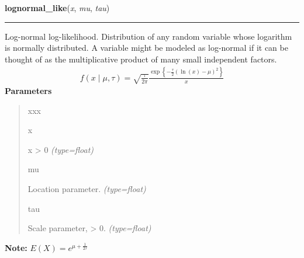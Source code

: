     \vspace{0.5ex}

\hspace{.8\funcindent}\begin{boxedminipage}{\funcwidth}

    \raggedright \textbf{lognormal\_like}(\textit{x}, \textit{mu}, \textit{tau})

    \vspace{-1.5ex}

    \rule{\textwidth}{0.5\fboxrule}
\setlength{\parskip}{2ex}

Log-normal log-likelihood. Distribution of any random variable whose
logarithm is normally distributed. A variable might be modeled as
log-normal if it can be thought of as the multiplicative product of many
small independent factors.
\begin{equation*}\begin{split}f(x \mid \mu, \tau) = \sqrt{\frac{\tau}{2\pi}}\frac{\exp\left\{ -\frac{\tau}{2} (\ln(x)-\mu)^2 \right\}}{x}\end{split}\end{equation*}\setlength{\parskip}{1ex}
      \textbf{Parameters}
      \vspace{-1ex}

      \begin{quote}
        \begin{Ventry}{xxx}

          \item[x]


x {\textgreater} 0
            {\it (type=float)}

          \item[mu]


Location parameter.
            {\it (type=float)}

          \item[tau]


Scale parameter, {\textgreater} 0.
            {\it (type=float)}

        \end{Ventry}

      \end{quote}

\textbf{Note:} 
$E(X)=e^{\mu+\frac{1}{2\tau}}$


    \end{boxedminipage}

    \label{distributions:mod_categor_like}

